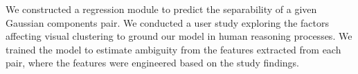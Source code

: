 \label{sec:regmodel}

We constructed a regression module to predict the separability of a given Gaussian components pair. 
We conducted a user study exploring the factors affecting visual clustering to ground our model in human reasoning processes. We trained the model to estimate ambiguity from the features extracted from each pair, where the features were engineered based on the study findings.






\newcommand{\purple}[1]{{\color{mypurple}#1}}
\newcommand{\orange}[1]{{\color{myorange}#1}}



